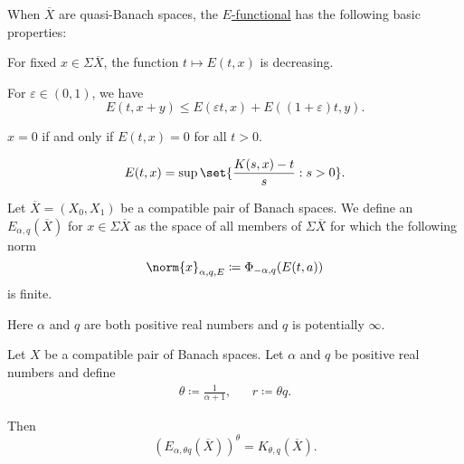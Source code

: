 \begin{proposition}\label{thm:def:e_functional/properties}
  When \( \overline{X} \) are quasi-Banach spaces, the \hyperref[def:e_functional]{\( E \)-functional} has the following basic properties:

  \begin{thmenum}
     For fixed \( x \in \Sigma\overline{X} \), the function \( t \mapsto E(t, x) \) is decreasing.

     For \( \varepsilon \in (0, 1) \), we have
    \begin{equation*}
      E(t, x + y) \leq E(\varepsilon t, x) + E((1 + \varepsilon) t, y).
    \end{equation*}

     \( x = 0 \) if and only if \( E(t, x) = 0 \) for all \( t > 0 \).

    \begin{equation*}
      E(t, x) = \sup \set{ \frac {K(s, x) - t} s : s > 0 }.
    \end{equation*}
  \end{thmenum}
\end{proposition}

\begin{definition}\label{def:approximation_space}
  Let \( \overline{X} = (X_0, X_1) \) be a compatible pair of Banach spaces. We define an  \( E_{\alpha,q}(\overline{X}) \) for \( x \in \Sigma\overline{X} \) as the space of all members of \( \Sigma\overline{X} \) for which the following norm
  \begin{equation}\label{eq:def:approximation_space/norm}
    \norm{x}_{\alpha,q,E} \coloneqq \Phi_{-\alpha,q}(E(t,a))
  \end{equation}
  is finite.

  Here \( \alpha \) and \( q \) are both positive real numbers and \( q \) is potentially \( \infty \).
\end{definition}

\begin{theorem}\label{thm:interpolation_space_and_approximation_space}
  Let \( X \) be a compatible pair of Banach spaces. Let \( \alpha \) and \( q \) be positive real numbers and define
  \begin{align*}
    \theta \coloneqq \frac 1 {\alpha + 1},
    &&
    r \coloneqq \theta q.
  \end{align*}

  Then
  \begin{equation*}
    (E_{\alpha,\theta q}(\overline{X}))^\theta = K_{\theta,q}(\overline{X}).
  \end{equation*}
\end{theorem}

